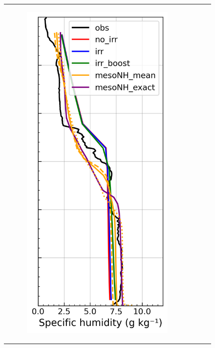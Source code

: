\begin{figure}[hbtp]
{\begin{tabular}{@{}cccc@{}}
\begin{subfigure}[t]{0.29\textwidth}
            \includegraphics[width=\textwidth]{images/chap5/profiles/profile_elsplans_ovap_1507_sensbins.png}

\end{subfigure}
\end{tabular}}
\end{figure}
